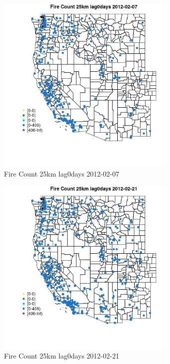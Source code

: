 \begin{figure} 
\centering  
\includegraphics[width=0.77\textwidth]{Code_Outputs/Report_ML_input_PM25_Step4_part_f_de_duplicated_aves_prioritize_24hr_obswNAs_MapObsFire_Count_25km_lag0days2012-02-07.jpg} 
\caption{\label{fig:Report_ML_input_PM25_Step4_part_f_de_duplicated_aves_prioritize_24hr_obswNAsMapObsFire_Count_25km_lag0days2012-02-07}Fire Count 25km lag0days 2012-02-07} 
\end{figure} 
 

\begin{figure} 
\centering  
\includegraphics[width=0.77\textwidth]{Code_Outputs/Report_ML_input_PM25_Step4_part_f_de_duplicated_aves_prioritize_24hr_obswNAs_MapObsFire_Count_25km_lag0days2012-02-21.jpg} 
\caption{\label{fig:Report_ML_input_PM25_Step4_part_f_de_duplicated_aves_prioritize_24hr_obswNAsMapObsFire_Count_25km_lag0days2012-02-21}Fire Count 25km lag0days 2012-02-21} 
\end{figure} 
 

